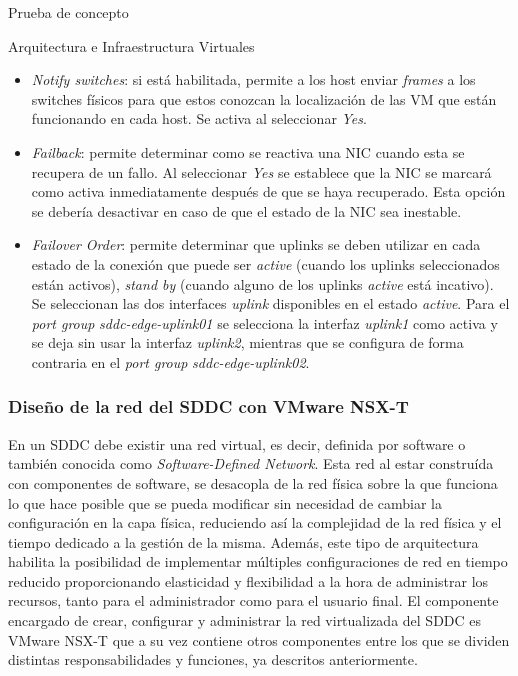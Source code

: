 \begin{section}{Prueba de concepto}
\begin{subsection}{Arquitectura e Infraestructura Virtuales\cite{CFVirtInfraes}}
\begin{itemize}
  \item \textit{Notify switches}: si está habilitada, permite a los host enviar \textit{frames} a los switches físicos para que estos conozcan la localización de las VM que están funcionando en cada host. Se activa al seleccionar \textit{Yes}.
  
  \item \textit{Failback}: permite determinar como se reactiva una NIC cuando esta se recupera de un fallo. Al seleccionar \textit{Yes} se establece que la NIC se marcará como activa inmediatamente después de que se haya recuperado. Esta opción se debería desactivar en caso de que el estado de la NIC sea inestable.
  
  \item \textit{Failover Order}: permite determinar que uplinks se deben utilizar en cada estado de la conexión que puede ser \textit{active} (cuando los uplinks seleccionados están activos), \textit{stand by} (cuando alguno de los uplinks \textit{active} está incativo). Se seleccionan las dos interfaces \textit{uplink} disponibles en el estado \textit{active}. Para el \textit{port group} \textit{sddc-edge-uplink01} se selecciona la interfaz \textit{uplink1} como activa y se deja sin usar la interfaz \textit{uplink2}, mientras que se configura de forma contraria en el \textit{port group} \textit{sddc-edge-uplink02}.
\end{itemize}


\subsubsection{Diseño de la red del SDDC con VMware NSX-T}
En un SDDC debe existir una red virtual, es decir, definida por software o también conocida como \textit{Software-Defined Network}. Esta red al estar construída con componentes de software, se desacopla de la red física sobre la que funciona lo que hace posible que se pueda modificar sin necesidad de cambiar la configuración en la capa física, reduciendo así la complejidad de la red física y el tiempo dedicado a la gestión de la misma. Además, este tipo de arquitectura habilita la posibilidad de implementar múltiples configuraciones de red en tiempo reducido proporcionando elasticidad y flexibilidad a la hora de administrar los recursos, tanto para el administrador como para el usuario final.
El componente encargado de crear, configurar y administrar la red virtualizada del SDDC es VMware NSX-T que a su vez contiene otros componentes entre los que se dividen distintas responsabilidades y funciones, ya descritos anteriormente.


\end{subsection}
\end{section}
